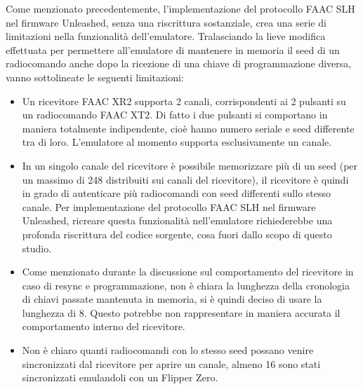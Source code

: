 Come menzionato precedentemente, l’implementazione del protocollo FAAC SLH nel firmware Unleashed, senza una riscrittura sostanziale, crea una serie di limitazioni nella funzionalità dell’emulatore. Tralasciando la lieve modifica effettuata per permettere all’emulatore di mantenere in memoria il seed di un radiocomando anche dopo la ricezione di una chiave di programmazione diversa, vanno sottolineate le seguenti limitazioni:
\begin{itemize}
  \item Un ricevitore FAAC XR2 supporta 2 canali, corrispondenti ai 2 pulsanti su un radiocomando FAAC XT2. Di fatto i due pulsanti si comportano in maniera totalmente indipendente, cioè hanno numero seriale e seed differente tra di loro. L’emulatore al momento supporta esclusivamente un canale.
  \item In un singolo canale del ricevitore è possibile memorizzare più di un seed (per un massimo di 248 distribuiti sui canali del ricevitore), il ricevitore è quindi in grado di autenticare più radiocomandi con seed differenti sullo stesso canale. Per implementazione del protocollo FAAC SLH nel firmware Unleashed, ricreare questa funzionalità nell’emulatore richiederebbe una profonda riscrittura del codice sorgente, cosa fuori dallo scopo di questo studio.
  \item Come menzionato durante la discussione sul comportamento del ricevitore in caso di resync e programmazione, non è chiara la lunghezza della cronologia di chiavi passate mantenuta in memoria, si è quindi deciso di usare la lunghezza di 8. Questo potrebbe non rappresentare in maniera accurata il comportamento interno del ricevitore.
  \item Non è chiaro quanti radiocomandi con lo stesso seed possano venire sincronizzati dal ricevitore per aprire un canale, almeno 16 sono stati sincronizzati emulandoli con un Flipper Zero.
\end{itemize}

